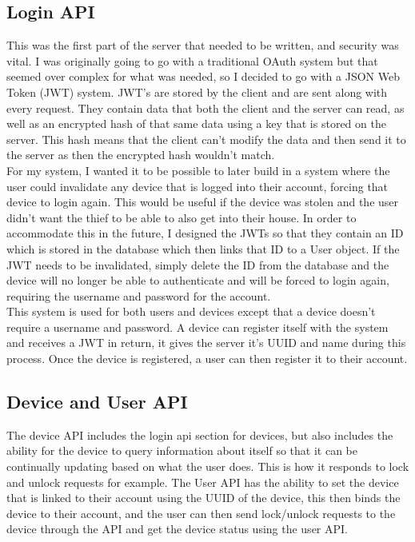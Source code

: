 \subsection{Login API}
This was the first part of the server that needed to be written, and security was vital. I was originally going to go with a traditional OAuth system but that seemed over complex for what was needed, so I decided to go with a JSON Web Token (JWT) system. JWT's are stored by the client and are sent along with every request. They contain data that both the client and the server can read, as well as an encrypted hash of that same data using a key that is stored on the server. This hash means that the client can't modify the data and then send it to the server as then the encrypted hash wouldn't match. 
\\
\indent For my system, I wanted it to be possible to later build in a system where the user could invalidate any device that is logged into their account, forcing that device to login again. This would be useful if the device was stolen and the user didn't want the thief to be able to also get into their house. In order to accommodate this in the future, I designed the JWTs so that they contain an ID which is stored in the database which then links that ID to a User object. If the JWT needs to be invalidated, simply delete the ID from the database and the device will no longer be able to authenticate and will be forced to login again, requiring the username and password for the account.
\\
\indent This system is used for both users and devices except that a device doesn't require a username and password. A device can register itself with the system and receives a JWT in return, it gives the server it's UUID and name during this process. Once the device is registered, a user can then register it to their account.

\subsection{Device and User API}
The device API includes the login api section for devices, but also includes the ability for the device to query information about itself so that it can be continually updating based on what the user does. This is how it responds to lock and unlock requests for example. The User API has the ability to set the device that is linked to their account using the UUID of the device, this then binds the device to their account, and the user can then send lock/unlock requests to the device through the API and get the device status using the user API.

